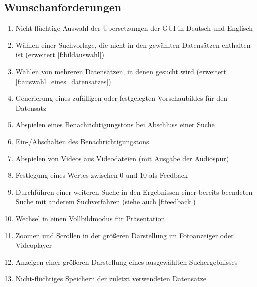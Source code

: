 \subsection{Wunschanforderungen}
\begin{enumerate} [label=\bfseries /FW \arabic*0/, leftmargin=*]
	\item Nicht-flüchtige Auswahl der Übersetzungen der \gls{GUI} in Deutsch und Englisch \label{fw:sprache}
	\newline
	\item Wählen einer Suchvorlage, die nicht in den gewählten Datensätzen enthalten ist (erweitert \ref{f:bildauswahl}) \label{fw:externe_suchvorlage}
	\item Wählen von mehreren Datensätzen, in denen gesucht wird (erweitert \ref{f:auswahl_eines_datensatzes}) \label{fw:mehrere_datensaetze_waehlen}
	\item Generierung eines zufälligen oder festgelegten Vorschaubildes für den Datensatz \label{fw:vorschaubild}
	\newline
	\item Abspielen eines Benachrichtigungstons bei Abschluss einer Suche \label{fw:signalton}
	\item Ein-/Abschalten des Benachrichtigungstons \label{fw:signalton_einaus}
	\item Abspielen von Videos aus Videodateien (mit Ausgabe der Audiospur) \label{fw:echtes_video_abspielen}
	\newline
	\item Festlegung eines Wertes zwischen 0 und 10 als Feedback \label{fw:zehner_feedback}
	\item Durchführen einer weiteren Suche in den Ergebnissen einer bereits beendeten Suche mit anderem Suchverfahren (siehe auch \ref{f:feedback}) \label{fw:weitere_suche}
	\newline
	\item Wechsel in einen Vollbildmodus für Präsentation \label{fw:präsentation}
	\item Zoomen und Scrollen in der größeren Darstellung im Fotoanzeiger oder Videoplayer \label{fw:zoom_scroll}
	\item Anzeigen einer größeren Darstellung eines ausgewählten Suchergebnisses \label{fw:groesseres_suchergebnis}
	\newline
	\item Nicht-flüchtiges Speichern der zuletzt verwendeten Datensätze \label{fw:speichern_historie}

\end{enumerate}
